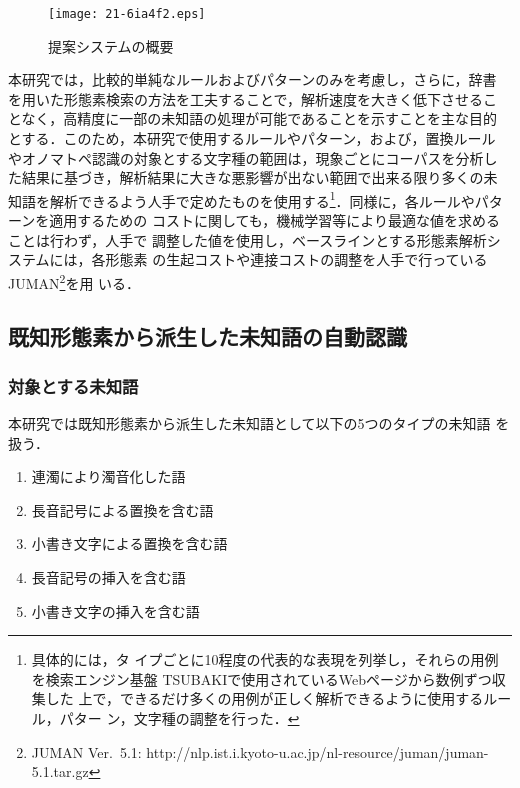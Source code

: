 \documentclass[japanese]{jnlp_1.4}
\begin{document}
  \begin{figure}[t]
   \begin{center}
    \texttt{[image: 21-6ia4f2.eps]}
   \end{center}
   \caption{提案システムの概要}
   \label{Figure::oisii}
  \end{figure}

\begin{exe}
\end{exe}

  本研究では，比較的単純なルールおよびパターンのみを考慮し，さらに，辞書
  を用いた形態素検索の方法を工夫することで，解析速度を大きく低下させるこ
  となく，高精度に一部の未知語の処理が可能であることを示すことを主な目的
  とする．このため，本研究で使用するルールやパターン，および，置換ルール
  やオノマトペ認識の対象とする文字種の範囲は，現象ごとにコーパスを分析し
  た結果に基づき，解析結果に大きな悪影響が出ない範囲で出来る限り多くの未
  知語を解析できるよう人手で定めたものを使用する\footnote{具体的には，タ
  イプごとに10程度の代表的な表現を列挙し，それらの用例を検索エンジン基盤
  TSUBAKI\cite{Shinzato2008}で使用されているWebページから数例ずつ収集した
  上で，できるだけ多くの用例が正しく解析できるように使用するルール，パター
  ン，文字種の調整を行った．}．同様に，各ルールやパターンを適用するための
  コストに関しても，機械学習等により最適な値を求めることは行わず，人手で
  調整した値を使用し，ベースラインとする形態素解析システムには，各形態素
  の生起コストや連接コストの調整を人手で行っているJUMAN\footnote{JUMAN
  Ver.~5.1:
  http://nlp.ist.i.kyoto-u.ac.jp/nl-resource/juman/juman-5.1.tar.gz}を用
  いる．


  \subsection{既知形態素から派生した未知語の自動認識}
  \label{SUBSEC::PRO}

   \subsubsection{対象とする未知語}

   本研究では既知形態素から派生した未知語として以下の5つのタイプの未知語
   を扱う．

   \begin{enumerate}
    \item 連濁により濁音化した語
    \item 長音記号による置換を含む語
    \item 小書き文字による置換を含む語
    \item 長音記号の挿入を含む語
    \item 小書き文字の挿入を含む語
   \end{enumerate}
\end{document}
